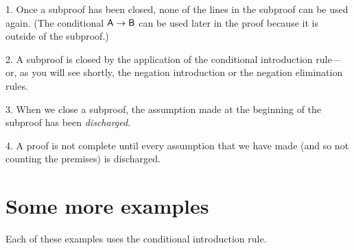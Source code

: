 \begin{earg}
\item[1.] Once a subproof has been closed, none of the lines in the subproof can be used again. (The conditional $\mathsf{A}\rightarrow\mathsf{B}$ can be used later in the proof because it is outside of the subproof.)
\item[2.] A subproof is closed by the application of the conditional introduction rule---or, as you will see shortly, the negation introduction or the negation elimination rules.
\item[3.] When we close a subproof, the assumption made at the beginning of the subproof has been \textit{discharged}.
\item[4.] A proof is not complete until every assumption that we have made (and so not counting the premises) is discharged.
\end{earg}


\section{Some more examples}

Each of these examples uses the conditional introduction rule.

